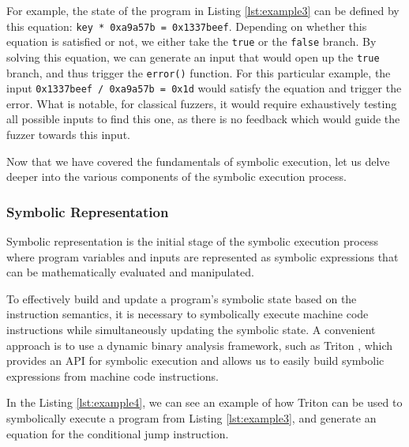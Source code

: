 For example, the state of the program in Listing \ref{lst:example3} can be defined by this equation: \texttt{key * 0xa9a57b = 0x1337beef}. Depending on whether this equation is satisfied or not, we either take the \texttt{true} or the \texttt{false} branch. By solving this equation, we can generate an input that would open up the \texttt{true} branch, and thus trigger the \texttt{error()} function. For this particular example, the input \texttt{0x1337beef / 0xa9a57b = 0x1d} would satisfy the equation and trigger the error. What is notable, for classical fuzzers, it would require exhaustively testing all possible inputs to find this one, as there is no feedback which would guide the fuzzer towards this input.

Now that we have covered the fundamentals of symbolic execution, let us delve deeper into the various components of the symbolic execution process.

\subsubsection{Symbolic Representation}

Symbolic representation is the initial stage of the symbolic execution process where program variables and inputs are represented as symbolic expressions that can be mathematically evaluated and manipulated.

To effectively build and update a program's symbolic state based on the instruction semantics, it is necessary to symbolically execute machine code instructions while simultaneously updating the symbolic state. A convenient approach is to use a dynamic binary analysis framework, such as Triton \cite{triton-sstic2015}, which provides an API for symbolic execution and allows us to easily build symbolic expressions from machine code instructions.

In the Listing \ref{lst:example4}, we can see an example of how Triton can be used to symbolically execute a program from Listing \ref{lst:example3}, and generate an equation for the conditional jump instruction.


